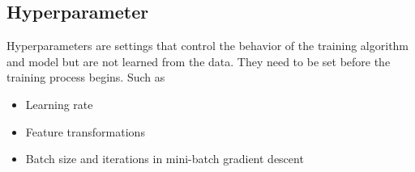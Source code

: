 \documentclass[twocolumn, 10pt]{article}
\begin{document}
\subsection*{Hyperparameter}
Hyperparameters are settings that control the behavior of the training algorithm and model but are not learned from the data. They need to be set before the training process begins. Such as 
\begin{itemize}
    \item Learning rate
    \item Feature transformations
    \item Batch size and iterations in mini-batch gradient descent
\end{itemize}
\begin{lstlisting}
    
\end{lstlisting}
\end{document}

